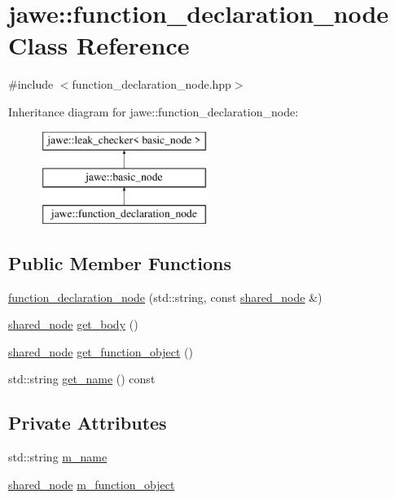 \hypertarget{classjawe_1_1function__declaration__node}{}\section{jawe\+:\+:function\+\_\+declaration\+\_\+node Class Reference}
\label{classjawe_1_1function__declaration__node}


{\ttfamily \#include $<$function\+\_\+declaration\+\_\+node.\+hpp$>$}

Inheritance diagram for jawe\+:\+:function\+\_\+declaration\+\_\+node\+:\begin{figure}[H]
\begin{center}
\leavevmode
\includegraphics[height=3.000000cm]{classjawe_1_1function__declaration__node}
\end{center}
\end{figure}
\subsection*{Public Member Functions}
\begin{DoxyCompactItemize}
\item 
\hyperlink{classjawe_1_1function__declaration__node_ac28b6a6e48b90529b7fda41db75228d5}{function\+\_\+declaration\+\_\+node} (std\+::string, const \hyperlink{namespacejawe_a3f307481d921b6cbb50cc8511fc2b544}{shared\+\_\+node} \&)
\item 
\hyperlink{namespacejawe_a3f307481d921b6cbb50cc8511fc2b544}{shared\+\_\+node} \hyperlink{classjawe_1_1function__declaration__node_a012175493728b93d76b640d81d457887}{get\+\_\+body} ()
\item 
\hyperlink{namespacejawe_a3f307481d921b6cbb50cc8511fc2b544}{shared\+\_\+node} \hyperlink{classjawe_1_1function__declaration__node_a94a22b3f65e84c0b5dbf3a328c622035}{get\+\_\+function\+\_\+object} ()
\item 
std\+::string \hyperlink{classjawe_1_1function__declaration__node_a14acad1583a39308f099a9af49c16552}{get\+\_\+name} () const
\end{DoxyCompactItemize}
\subsection*{Private Attributes}
\begin{DoxyCompactItemize}
\item 
std\+::string \hyperlink{classjawe_1_1function__declaration__node_a1766e81709b60ebfddc3806728ec2d0c}{m\+\_\+name}
\item 
\hyperlink{namespacejawe_a3f307481d921b6cbb50cc8511fc2b544}{shared\+\_\+node} \hyperlink{classjawe_1_1function__declaration__node_a4b9bacead9449c28465ae3e8062cedd2}{m\+\_\+function\+\_\+object}
\end{DoxyCompactItemize}
